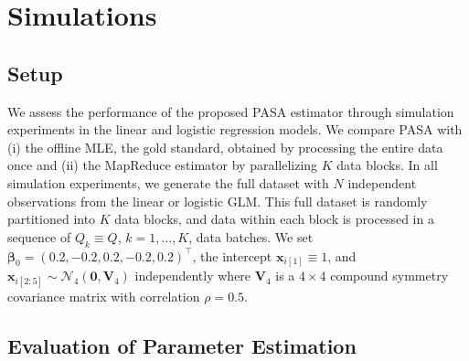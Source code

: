 \documentclass[12pt]{article}
\newcommand{\bV}{\boldsymbol{V}}
\newcommand{\bx}{\boldsymbol{x}}
\newcommand{\bbeta}{\boldsymbol{\beta}}
\begin{document}
\section{Simulations}
\label{sec:simulations}

\subsection{Setup}
\label{subsec:simulations:setup}
We assess the performance of the proposed PASA estimator through simulation experiments in the linear and logistic regression models. We compare PASA with (i) the offline MLE, the gold standard, obtained by processing the entire data once and (ii) the MapReduce estimator by parallelizing $K$ data blocks. In all simulation experiments, we generate the full dataset with $N$ independent observations from the linear or logistic GLM. This full dataset is randomly partitioned into $K$ data blocks, and data within each block is processed in a sequence of $Q_k\equiv Q$, $k=1, \ldots, K$, data batches. We set $\bbeta_0=(0.2, -0.2, 0.2, -0.2, 0.2)^\top$, the intercept $\bx_{i[1]}\equiv 1$, and $\bx_{i[2:5]}\sim\mathcal{N}_4(\bm{0},\bV_4)$ independently where $\bV_4$ is a $4\times 4$ compound symmetry covariance matrix with correlation $\rho=0.5$.

\subsection{Evaluation of Parameter Estimation}
\label{subsec:simulations:evaluation}
\end{document}
